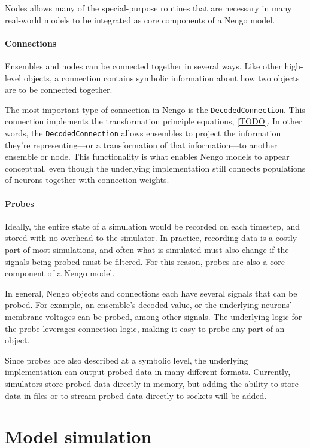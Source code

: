 \documentclass{frontiersSCNS}
\begin{document}
Nodes allows many of the special-purpose
routines that are necessary in many real-world
models to be integrated
as core components of a Nengo model.

\paragraph{Connections}

Ensembles and nodes can be connected together
in several ways.
Like other high-level objects,
a connection contains symbolic information
about how two objects are to be connected
together.

The most important type of connection
in Nengo is the \texttt{DecodedConnection}.
This connection implements
the transformation principle equations,
\eqref{TODO}.
In other words, the \texttt{DecodedConnection}
allows ensembles to project
the information they're representing---or
a transformation of that information---to
another ensemble or node.
This functionality is what enables Nengo models
to appear conceptual,
even though the underlying implementation
still connects populations of neurons
together with connection weights.

\paragraph{Probes}

Ideally, the entire state of a simulation
would be recorded on each timestep,
and stored with no overhead to the simulator.
In practice, recording data
is a costly part of most simulations,
and often what is simulated must also change
if the signals being probed must be filtered.
For this reason, probes are also
a core component of a Nengo model.

In general, Nengo objects and connections
each have several signals that can be probed.
For example, an ensemble's decoded value,
or the underlying neurons' membrane voltages
can be probed, among other signals.
The underlying logic for the probe
leverages connection logic,
making it easy to probe any part of an object.

Since probes are also described
at a symbolic level,
the underlying implementation
can output probed data in many different formats.
Currently, simulators store probed data
directly in memory,
but adding the ability to store data
in files or to stream probed data
directly to sockets will be added.

\section{Model simulation} \label{sec:simulators}
\end{document}
